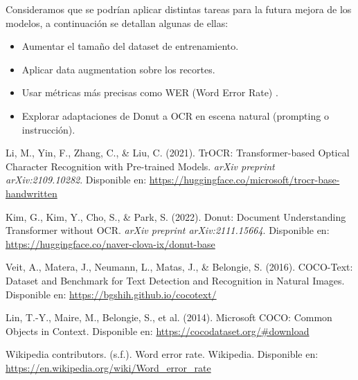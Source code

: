 \documentclass[12pt]{article}
\begin{document}
Consideramos que se podrían aplicar distintas tareas para la futura mejora de los modelos, a continuación
se detallan algunas de ellas:

\begin{itemize}
    \item Aumentar el tamaño del dataset de entrenamiento.
    \item Aplicar data augmentation sobre los recortes.
    \item Usar métricas más precisas como WER (Word Error Rate) \cite{wer}.
    \item Explorar adaptaciones de Donut a OCR en escena natural (prompting o instrucción).
\end{itemize}

\begin{thebibliography}{9}

Li, M., Yin, F., Zhang, C., \& Liu, C. (2021). TrOCR: Transformer-based Optical Character Recognition with Pre-trained Models. \textit{arXiv preprint arXiv:2109.10282}.  
Disponible en: \url{https://huggingface.co/microsoft/trocr-base-handwritten}

Kim, G., Kim, Y., Cho, S., \& Park, S. (2022). Donut: Document Understanding Transformer without OCR. \textit{arXiv preprint arXiv:2111.15664}.  
Disponible en: \url{https://huggingface.co/naver-clova-ix/donut-base}

Veit, A., Matera, J., Neumann, L., Matas, J., \& Belongie, S. (2016). COCO-Text: Dataset and Benchmark for Text Detection and Recognition in Natural Images.  
Disponible en: \url{https://bgshih.github.io/cocotext/}

Lin, T.-Y., Maire, M., Belongie, S., et al. (2014). Microsoft COCO: Common Objects in Context.  
Disponible en: \url{https://cocodataset.org/#download}

Wikipedia contributors. (s.f.). Word error rate. Wikipedia.  
Disponible en: \url{https://en.wikipedia.org/wiki/Word_error_rate}

\end{thebibliography}
\end{document}
